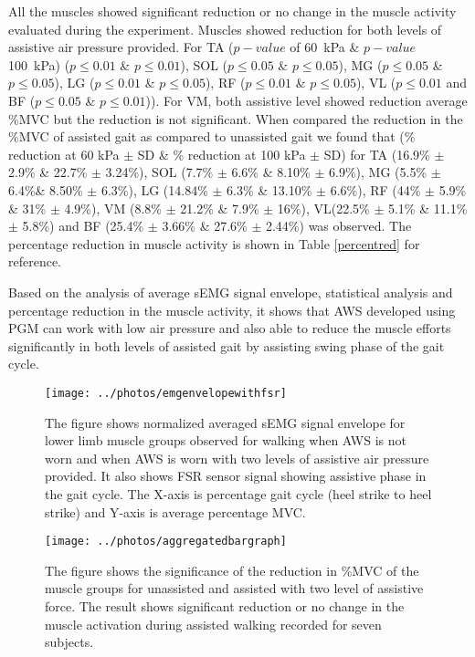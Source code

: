 \documentclass[letterpaper, 10 pt, conference]{ieeeconf}  %
\begin{document}
All the muscles showed significant reduction or no change in the muscle activity evaluated during the experiment. Muscles showed reduction for both levels of assistive air pressure provided. For TA ($p-value$ of \SI{60}{\kilo\pascal} \& $p-value$  \SI{100}{\kilo\pascal}) ($p\le0.01$ \& $p\le0.01$), SOL ($p\le0.05$ \& $p\le0.05$), MG ($p\le0.05$ \& $p\le0.05$), LG ($p\le0.01$ \& $p\le0.05$), RF ($p\le0.01$ \& $p\le0.05$), VL ($p\le0.01$ and BF ($p\le0.05$ \& $p\le0.01$)). For VM, both assistive level showed reduction average \%MVC but the reduction is not significant. When compared the reduction in the \%MVC of assisted gait as compared to unassisted gait we found that (\% reduction at 60 kPa $\pm$ SD \& \% reduction at 100 kPa $\pm$ SD) for TA (16.9\% $\pm$ 2.9\% \& 22.7\% $\pm$ 3.24\%), SOL (7.7\% $\pm$ 6.6\% \& 8.10\% $\pm$ 6.9\%), MG (5.5\% $\pm$ 6.4\%\& 8.50\% $\pm$ 6.3\%), LG (14.84\% $\pm$ 6.3\% \& 13.10\% $\pm$ 6.6\%), RF (44\% $\pm$ 5.9\% \& 31\% $\pm$ 4.9\%), VM (8.8\% $\pm$ 21.2\% \& 7.9\% $\pm$ 16\%), VL(22.5\% $\pm$ 5.1\% \& 11.1\% $\pm$ 5.8\%) and BF (25.4\% $\pm$ 3.66\% \& 27.6\% $\pm$ 2.44\%) was observed. The percentage reduction in muscle activity is shown in Table \ref{percentred} for reference. 

Based on the analysis of average sEMG signal envelope, statistical analysis and percentage reduction in the muscle activity, it shows that AWS developed using PGM can work with low air pressure and also able to reduce the muscle efforts significantly in both levels of assisted gait by assisting swing phase of the gait cycle. 

\begin{figure*}
	\centering
	\texttt{[image: ../photos/emgenvelopewithfsr]}
	\caption{The figure shows normalized averaged sEMG signal envelope for lower limb muscle groups observed for walking when AWS is not worn and when AWS is worn with two levels of assistive air pressure provided. It also shows FSR sensor signal showing assistive phase in the gait cycle. The X-axis is percentage gait cycle (heel strike to heel strike) and Y-axis is average percentage MVC.}
	\label{fig:emgenvelope}
\end{figure*}

\begin{figure*}
	\centering
	\texttt{[image: ../photos/aggregatedbargraph]}
	\caption{The figure shows the significance of the reduction in \%MVC of the muscle groups for unassisted and assisted with two level of assistive force. The result shows significant reduction or no change in the muscle activation during assisted walking recorded for seven subjects.}
	\label{fig:aggregatedbargraph}
\end{figure*}
\end{document}

